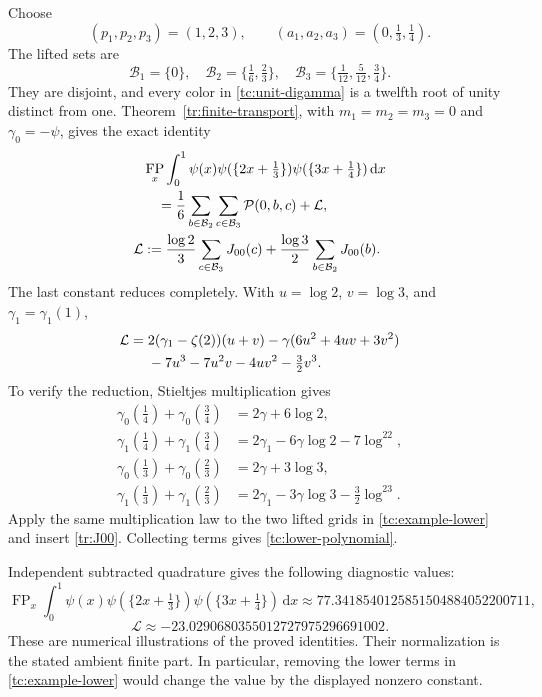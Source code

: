 \documentclass[11pt,a4paper]{article}
\numberwithin{equation}{section}
\theoremstyle{definition}
\theoremstyle{remark}
\DeclareMathOperator{\FP}{FP}
\newcommand{\dd}{\,\mathrm d}
\begin{document}
Choose
\begin{equation}\label{tc:example-data}
 (p_1,p_2,p_3)=(1,2,3),\qquad
 (a_1,a_2,a_3)=(0,\tfrac13,\tfrac14).
\end{equation}
The lifted sets are
\[
 \mathcal B_1=\{0\},\quad
 \mathcal B_2=\{\tfrac16,\tfrac23\},\quad
 \mathcal B_3=\{\tfrac1{12},\tfrac5{12},\tfrac34\}.
\]
They are disjoint, and every color in \eqref{tc:unit-digamma} is a
twelfth root of unity distinct from one. Theorem~\ref{tr:finite-transport},
with $m_1=m_2=m_3=0$ and $\gamma_0=-\psi$, gives the exact identity
\begin{align}
 &\FP_x\int_0^1\psi(x)\psi(\{2x+\tfrac13\})
                              \psi(\{3x+\tfrac14\})\dd x\notag\\
 &\quad=\frac16\sum_{b\in\mathcal B_2}\sum_{c\in\mathcal B_3}
                     \mathcal P(0,b,c)+\mathcal L,\label{tc:example}\\
 \mathcal L
 &:=\frac{\log2}{3}\sum_{c\in\mathcal B_3}J_{00}(c)
       +\frac{\log3}{2}\sum_{b\in\mathcal B_2}J_{00}(b).
       \label{tc:example-lower}
\end{align}
The last constant reduces completely. With $u=\log2$, $v=\log3$,
and $\gamma_1=\gamma_1(1)$,
\begin{align}\label{tc:lower-polynomial}
 \mathcal L={}&2(\gamma_1-\zeta(2))(u+v)
   -\gamma(6u^2+4uv+3v^2)\notag\\
 &-7u^3-7u^2v-4uv^2-\tfrac32v^3.
\end{align}
To verify the reduction, Stieltjes multiplication gives
\begin{align*}
 \gamma_0(\tfrac14)+\gamma_0(\tfrac34)&=2\gamma+6\log2,\\
 \gamma_1(\tfrac14)+\gamma_1(\tfrac34)
      &=2\gamma_1-6\gamma\log2-7\log^22,\\
 \gamma_0(\tfrac13)+\gamma_0(\tfrac23)&=2\gamma+3\log3,\\
 \gamma_1(\tfrac13)+\gamma_1(\tfrac23)
      &=2\gamma_1-3\gamma\log3-\tfrac32\log^23.
\end{align*}
Apply the same multiplication law to the two lifted grids in
\eqref{tc:example-lower} and insert \eqref{tr:J00}. Collecting terms
gives \eqref{tc:lower-polynomial}.

Independent subtracted quadrature gives the following diagnostic values:
\[
 \FP_x\int_0^1\psi(x)\psi(\{2x+\tfrac13\})
                \psi(\{3x+\tfrac14\})\dd x
       \approx77.3418540125851504884052200711,
\]
\[
 \mathcal L\approx-23.0290680355012727975296691002.
\]
These are numerical illustrations of the proved identities. Their
normalization is the stated ambient finite part. In particular, removing
the lower terms in \eqref{tc:example-lower} would change the value by
the displayed nonzero constant.
\end{document}
